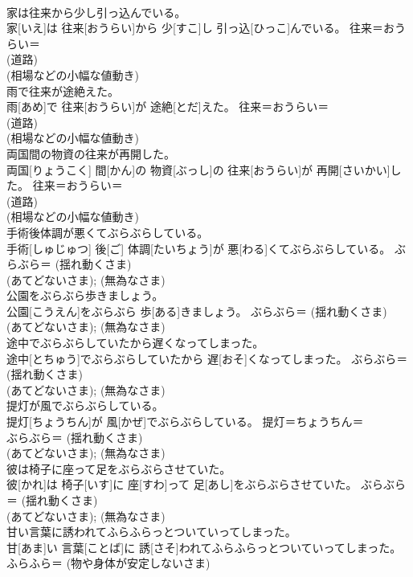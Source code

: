 \documentclass[8pt]{extreport}
\begin{document}
\begin{CJK}{UTF8}{min}
{\\	家は往来から少し引っ込んでいる。	
\\	家[いえ]は 往来[おうらい]から 少[すこ]し 引っ込[ひっこ]んでいる。	往来＝おうらい＝ 
\\	(道路) 
\\	(相場などの小幅な値動き) 
\\	雨で往来が途絶えた。	
\\	雨[あめ]で 往来[おうらい]が 途絶[とだ]えた。	往来＝おうらい＝ 
\\	(道路) 
\\	(相場などの小幅な値動き) 
\\	両国間の物資の往来が再開した。	
\\	両国[りょうこく] 間[かん]の 物資[ぶっし]の 往来[おうらい]が 再開[さいかい]した。	往来＝おうらい＝ 
\\	(道路) 
\\	(相場などの小幅な値動き) 
\\	手術後体調が悪くてぶらぶらしている。	
\\	手術[しゅじゅつ] 後[ご] 体調[たいちょう]が 悪[わる]くてぶらぶらしている。	ぶらぶら＝ (揺れ動くさま) 
\\	(あてどないさま); (無為なさま) 
\\	公園をぶらぶら歩きましょう。	
\\	公園[こうえん]をぶらぶら 歩[ある]きましょう。	ぶらぶら＝ (揺れ動くさま) 
\\	(あてどないさま); (無為なさま) 
\\	途中でぶらぶらしていたから遅くなってしまった。	
\\	途中[とちゅう]でぶらぶらしていたから 遅[おそ]くなってしまった。	ぶらぶら＝ (揺れ動くさま) 
\\	(あてどないさま); (無為なさま) 
\\	提灯が風でぶらぶらしている。	
\\	提灯[ちょうちん]が 風[かぜ]でぶらぶらしている。	提灯＝ちょうちん＝ 
\\	ぶらぶら＝ (揺れ動くさま) 
\\	(あてどないさま); (無為なさま) 
\\	彼は椅子に座って足をぶらぶらさせていた。	
\\	彼[かれ]は 椅子[いす]に 座[すわ]って 足[あし]をぶらぶらさせていた。	ぶらぶら＝ (揺れ動くさま) 
\\	(あてどないさま); (無為なさま) 
\\	甘い言葉に誘われてふらふらっとついていってしまった。	
\\	甘[あま]い 言葉[ことば]に 誘[さそ]われてふらふらっとついていってしまった。	ふらふら＝ (物や身体が安定しないさま) 
}
\end{CJK}
\end{document}
